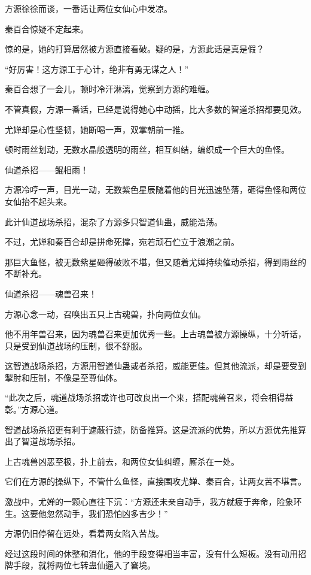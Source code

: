 \begin{this_body}
方源徐徐而谈，一番话让两位女仙心中发凉。

秦百合惊疑不定起来。

惊的是，她的打算居然被方源直接看破。疑的是，方源此话是真是假？

“好厉害！这方源工于心计，绝非有勇无谋之人！”

秦百合想了一会儿，顿时冷汗淋漓，觉察到方源的难缠。

不管真假，方源一番话，已经是说得她心中动摇，比大多数的智道杀招都要见效。

尤婵却是心性坚韧，她断喝一声，双掌朝前一推。

顿时雨丝划动，无数水晶般透明的雨丝，相互纠结，编织成一个巨大的鱼怪。

仙道杀招——鲲相雨！

方源冷哼一声，目光一动，无数紫色星辰随着他的目光迅速坠落，砸得鱼怪和两位女仙抬不起头来。

此计仙道战场杀招，混杂了方源多只智道仙蛊，威能浩荡。

不过，尤婵和秦百合却是拼命死撑，宛若顽石伫立于浪潮之前。

那巨大鱼怪，被无数紫星砸得破败不堪，但又随着尤婵持续催动杀招，得到雨丝的不断补充。

仙道杀招——魂兽召来！

方源心念一动，召唤出五只上古魂兽，扑向两位女仙。

他不用年兽召来，因为魂兽召来更加优秀一些。上古魂兽被方源操纵，十分听话，只是受到仙道战场的压制，很不舒服。

这智道战场杀招，方源用智道仙蛊或者杀招，威能更佳。但其他流派，却是要受到掣肘和压制，不像是至尊仙体。

“此次之后，魂道战场杀招或许也可改良出一个来，搭配魂兽召来，将会相得益彰。”方源心道。

智道战场杀招更有利于遮蔽行迹，防备推算。这是流派的优势，所以方源优先推算出了智道战场杀招。

上古魂兽凶恶至极，扑上前去，和两位女仙纠缠，厮杀在一处。

它们在方源的操纵下，不管什么鱼怪，直接围攻尤婵、秦百合，让两女苦不堪言。

激战中，尤婵的一颗心直往下沉：“方源还未亲自动手，我方就疲于奔命，险象环生。这要他忽然动手，我们恐怕凶多吉少！”

方源仍旧停留在远处，看着两女陷入苦战。

经过这段时间的休整和消化，他的手段变得相当丰富，没有什么短板。没有动用招牌手段，就将两位七转蛊仙逼入了窘境。

\end{this_body}

